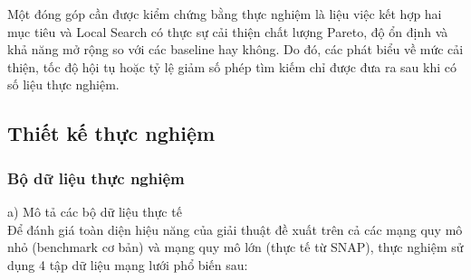 \documentclass[14pt,a4paper]{extarticle}
\begin{document}
Một đóng góp cần được kiểm chứng bằng thực nghiệm là liệu việc kết hợp hai mục tiêu và Local Search có thực sự cải thiện chất lượng Pareto, độ ổn định và khả năng mở rộng so với các baseline hay không. Do đó, các phát biểu về mức cải thiện, tốc độ hội tụ hoặc tỷ lệ giảm số phép tìm kiếm chỉ được đưa ra sau khi có số liệu thực nghiệm.

\subsection{Thiết kế thực nghiệm}

\subsubsection{Bộ dữ liệu thực nghiệm}

\noindent a) Mô tả các bộ dữ liệu thực tế \\
Để đánh giá toàn diện hiệu năng của giải thuật đề xuất trên cả các mạng quy mô nhỏ (benchmark cơ bản) và mạng quy mô lớn (thực tế từ SNAP), thực nghiệm sử dụng 4 tập dữ liệu mạng lưới phổ biến sau:
\end{document}
